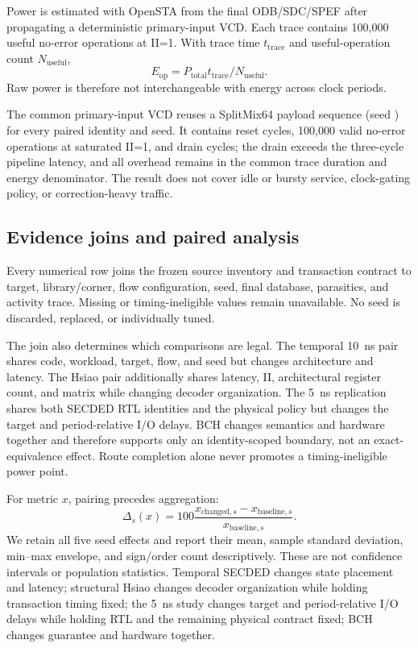 \documentclass[conference,10pt]{IEEEtran}
\begin{document}
Power is estimated with OpenSTA from the final ODB/SDC/SPEF after propagating a deterministic primary-input VCD. Each trace contains 100,000 useful no-error operations at II=1. With trace time $t_{\mathrm{trace}}$ and useful-operation count $N_{\mathrm{useful}}$,
\begin{equation}
 E_{\mathrm{op}}=P_{\mathrm{total}}t_{\mathrm{trace}}/N_{\mathrm{useful}}.
 \label{eq:energy}
\end{equation}
Raw power is therefore not interchangeable with energy across clock periods.

The common primary-input VCD reuses a SplitMix64 payload sequence (seed \PayloadSeed) for every paired identity and seed. It contains \ResetCycles{} reset cycles, 100,000 valid no-error operations at saturated II=1, and \DrainCycles{} drain cycles; the drain exceeds the three-cycle pipeline latency, and all overhead remains in the common trace duration and energy denominator. The result does not cover idle or bursty service, clock-gating policy, or correction-heavy traffic.

\subsection{Evidence joins and paired analysis}

Every numerical row joins the frozen source inventory and transaction contract to target, library/corner, flow configuration, seed, final database, parasitics, and activity trace. Missing or timing-ineligible values remain unavailable. No seed is discarded, replaced, or individually tuned.

The join also determines which comparisons are legal. The temporal 10~ns pair shares code, workload, target, flow, and seed but changes architecture and latency. The Hsiao pair additionally shares latency, II, architectural register count, and matrix while changing decoder organization. The 5~ns replication shares both SECDED RTL identities and the physical policy but changes the target and period-relative I/O delays. BCH changes semantics and hardware together and therefore supports only an identity-scoped boundary, not an exact-equivalence effect. Route completion alone never promotes a timing-ineligible power point.

For metric $x$, pairing precedes aggregation:
\begin{equation}
 \Delta_s(x)=100\frac{x_{\mathrm{changed},s}-x_{\mathrm{baseline},s}}
 {x_{\mathrm{baseline},s}}.
 \label{eq:paired}
\end{equation}
We retain all five seed effects and report their mean, sample standard deviation, min--max envelope, and sign/order count descriptively. These are not confidence intervals or population statistics. Temporal SECDED changes state placement and latency; structural Hsiao changes decoder organization while holding transaction timing fixed; the 5~ns study changes target and period-relative I/O delays while holding RTL and the remaining physical contract fixed; BCH changes guarantee and hardware together.
\end{document}
